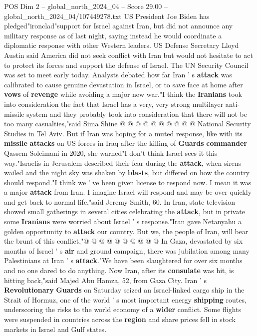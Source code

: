 \begin{textsample}{POS Dim 2 – global\_north\_2024\_04 – Score 29.00 – global\_north\_2024\_04/107449278.txt}
US President Joe Biden has pledged"ironclad"support for Israel against Iran, but did not announce any military response as of last night, saying instead he would coordinate a diplomatic response with other Western leaders.
US Defense Secretary Lloyd Austin said America did not seek conflict with Iran but would not hesitate to act to protect its forces and support the defense of Israel.
The UN Security Council was set to meet early today.
Analysts debated how far Iran ' s \textbf{attack} was calibrated to cause genuine devastation in Israel, or to save face at home after \textbf{vows} of \textbf{revenge} while avoiding a major new war."I think the \textbf{Iranians} took into consideration the fact that Israel has a very, very strong multilayer anti-missile system and they probably took into consideration that there will not be too many casualties,"said Sima Shine @ @ @ @ @ @ @ @ @ @ National Security Studies in Tel Aviv.
But if Iran was hoping for a muted response, like with its \textbf{missile} \textbf{attacks} on US forces in Iraq after the killing of \textbf{Guards} \textbf{commander} Qassem Soleimani in 2020, she warned"I don't think Israel sees it this way."Israelis in Jerusalem described their fear during the \textbf{attack}, when sirens wailed and the night sky was shaken by \textbf{blasts}, but differed on how the country should respond."I think we ' ve been given license to respond now.
I mean it was a major \textbf{attack} from Iran.
I imagine Israel will respond and may be over quickly and get back to normal life,"said Jeremy Smith, 60.
In Iran, state television showed small gatherings in several cities celebrating the \textbf{attack}, but in private some \textbf{Iranians} were worried about Israel ' s response."Iran gave Netanyahu a golden opportunity to \textbf{attack} our country.
But we, the people of Iran, will bear the brunt of this conflict,"@ @ @ @ @ @ @ @ @ @ In Gaza, devastated by six months of Israel ' s \textbf{air} and ground campaign, there was jubilation among many Palestinians at Iran ' s \textbf{attack}."We have been slaughtered for over six months and no one dared to do anything.
Now Iran, after its \textbf{consulate} was hit, is hitting back,"said Majed Abu Hamza, 52, from Gaza City.
Iran ' s \textbf{Revolutionary} \textbf{Guards} on Saturday seized an Israel-linked cargo ship in the Strait of Hormuz, one of the world ' s most important energy \textbf{shipping} routes, underscoring the risks to the world economy of a \textbf{wider} conflict.
Some flights were suspended in countries across the \textbf{region} and share prices fell in stock markets in Israel and Gulf states.

\end{textsample}
